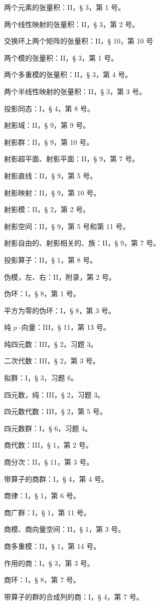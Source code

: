两个元素的张量积：II，§ 3，第 1 号。

两个线性映射的张量积：II，§ 3，第 2 号。

交换环上两个矩阵的张量积：II，§ 10，第 10 号

两个模的张量积：II，§ 3，第 1 号。

两个多重模的张量积：II，§ 3，第 4 号。

两个半线性映射的张量积：II，§ 3，第 3 号。

投影同态：I，§ 4，第 8 号。

射影域：II，§ 9，第 9 号。

射影群：II，§ 9，第 10 号。

射影超平面、射影平面：II，§ 9，第 7 号。

射影直线：II，§ 9，第 5 号。

射影映射：II，§ 9，第 10 号。

射影模：II，§ 2，第 2 号。

射影空间：II，§ 9，第 5 号和第 11 号。

射影自由的、射影相关的、族：II，§ 9，第 7 号。

投影算子：II，§ 1，第 8 号。

伪模，左、右：II，附录，第 2 号。

伪环：I，§ 8，第 1 号。

平方为零的伪环：I，§ 8，第 3 号。

纯 \(p\) -向量：III，§ 11，第 13 号。

纯四元数：III，§ 2，习题 3。

二次代数：III，§ 2，第 3 号。

拟群：I，§ 3，习题 6。

四元数，纯：III，§ 2，习题 3。

四元数代数：III，§ 2，第 5 号。

四元数群：I，§ 6，习题 4。

商代数：III，§ 1，第 2 号。

商分次：II，§ 11，第 3 号。

带算子的商群：I，§ 4，第 4 号。

商律：I，§ 1，第 6 号。

商广群：I，§ 1，第 11 号。

商模、商向量空间：II，§ 1，第 3 号。

商多重模：II，§ 1，第 14 号。

作用的商：I，§ 3，第 3 号。

商环：I，§ 8，第 7 号。

带算子的群的合成列的商：I，§ 4，第 7 号。

